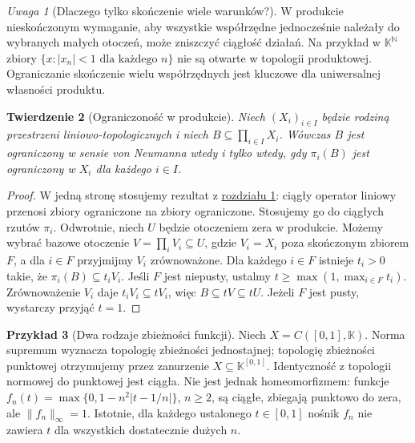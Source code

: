 \documentclass[11pt,a4paper]{article}
\numberwithin{equation}{section}
\theoremstyle{plain}
\newtheorem{twierdzenie}{Twierdzenie}[section]
\theoremstyle{definition}
\newtheorem{przyklad}[twierdzenie]{Przykład}
\theoremstyle{remark}
\newtheorem{uwaga}[twierdzenie]{Uwaga}
\newcommand{\N}{\mathbb N}
\newcommand{\K}{\mathbb K}
\begin{document}
\begin{uwaga}[Dlaczego tylko skończenie wiele warunków?]
W produkcie nieskończonym wymaganie, aby wszystkie
współrzędne jednocześnie należały do wybranych małych otoczeń,
może zniszczyć ciągłość działań. Na przykład w $\K^{\N}$
zbiory $\{x:|x_n|<1\text{ dla każdego }n\}$ nie są otwarte
w topologii produktowej. Ograniczanie skończenie wielu
współrzędnych jest kluczowe dla uniwersalnej własności produktu.
\end{uwaga}

\begin{twierdzenie}[Ograniczoność w produkcie]\label{thm:product-bounded}
Niech $(X_i)_{i\in I}$ będzie rodziną przestrzeni
liniowo-topologicznych i niech $B\subseteq\prod_{i\in I}X_i$.
Wówczas $B$ jest ograniczony w sensie von Neumanna wtedy
i tylko wtedy, gdy $\pi_i(B)$ jest ograniczony w $X_i$
dla każdego $i\in I$.
\end{twierdzenie}
\begin{proof}
W jedną stronę stosujemy rezultat z \hyperref[sec:tvs]{rozdziału 1}: ciągły operator liniowy
przenosi zbiory ograniczone na zbiory ograniczone. Stosujemy go do ciągłych rzutów $\pi_i$.
Odwrotnie, niech $U$ będzie otoczeniem zera w produkcie.
Możemy wybrać bazowe otoczenie $V=\prod_i V_i\subseteq U$,
gdzie $V_i=X_i$ poza skończonym zbiorem $F$, a dla $i\in F$
przyjmijmy $V_i$ zrównoważone. Dla każdego $i\in F$ istnieje
$t_i>0$ takie, że $\pi_i(B)\subseteq t_iV_i$.
Jeśli $F$ jest niepusty, ustalmy $t\geq\max(1,\max_{i\in F}t_i)$.
Zrównoważenie $V_i$ daje $t_iV_i\subseteq tV_i$, więc
$B\subseteq tV\subseteq tU$. Jeżeli $F$ jest pusty,
wystarczy przyjąć $t=1$.
\end{proof}

\begin{przyklad}[Dwa rodzaje zbieżności funkcji]
Niech $X=C([0,1],\K)$. Norma supremum wyznacza topologię
zbieżności jednostajnej; topologię zbieżności punktowej
otrzymujemy przez zanurzenie $X\subseteq\K^{[0,1]}$.
Identyczność z topologii normowej do punktowej jest ciągła.
Nie jest jednak homeomorfizmem: funkcje
$f_n(t)=\max\{0,1-n^2|t-1/n|\}$, $n\geq2$, są ciągłe,
zbiegają punktowo do zera, ale $\|f_n\|_\infty=1$.
Istotnie, dla każdego ustalonego $t\in[0,1]$ nośnik $f_n$
nie zawiera $t$ dla wszystkich dostatecznie dużych $n$.
\end{przyklad}
\end{document}
